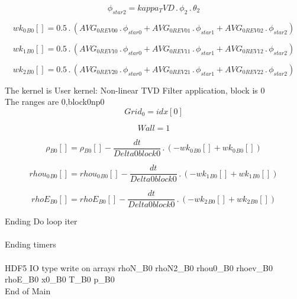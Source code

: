 \documentclass{article}
\begin{document}
\begin{dmath}\phi_{star 2} = kappa_TVD \,.\, \phi_{2} \,.\, \theta_{2}\end{dmath}

\begin{dmath}{wk_{0}{_{B0}}}[{}] = 0.5 \,.\, \left(AVG_{0 REV 00} \,.\, \phi_{star 0} + AVG_{0 REV 01} \,.\, \phi_{star 1} + AVG_{0 REV 02} \,.\, \phi_{star 2}\right)\end{dmath}

\begin{dmath}{wk_{1}{_{B0}}}[{}] = 0.5 \,.\, \left(AVG_{0 REV 10} \,.\, \phi_{star 0} + AVG_{0 REV 11} \,.\, \phi_{star 1} + AVG_{0 REV 12} \,.\, \phi_{star 2}\right)\end{dmath}

\begin{dmath}{wk_{2}{_{B0}}}[{}] = 0.5 \,.\, \left(AVG_{0 REV 20} \,.\, \phi_{star 0} + AVG_{0 REV 21} \,.\, \phi_{star 1} + AVG_{0 REV 22} \,.\, \phi_{star 2}\right)\end{dmath}

\noindent The kernel is User kernel: Non-linear TVD Filter application, block is 0\\\noindent The ranges are 0,block0np0\\\begin{dmath}Grid_{0} = {idx}[{0}]\end{dmath}

\begin{dmath}Wall = 1\end{dmath}

\begin{dmath}{\rho{_{B0}}}[{}] = {\rho{_{B0}}}[{}] - \frac{dt}{Delta0block0} \,.\, \left(- {wk_{0}{_{B0}}}[{}] + {wk_{0}{_{B0}}}[{}]\right)\end{dmath}

\begin{dmath}{rhou_{0}{_{B0}}}[{}] = {rhou_{0}{_{B0}}}[{}] - \frac{dt}{Delta0block0} \,.\, \left(- {wk_{1}{_{B0}}}[{}] + {wk_{1}{_{B0}}}[{}]\right)\end{dmath}

\begin{dmath}{rhoE{_{B0}}}[{}] = {rhoE{_{B0}}}[{}] - \frac{dt}{Delta0block0} \,.\, \left(- {wk_{2}{_{B0}}}[{}] + {wk_{2}{_{B0}}}[{}]\right)\end{dmath}

\noindent Ending Do loop iter\\
\\\noindent Ending timers\\
\\\noindent HDF5 IO type write on arrays rhoN_B0 rhoN2_B0 rhou0_B0 rhoev_B0 rhoE_B0 x0_B0 T_B0 p_B0\\\noindent End of Main\\
\end{document}

